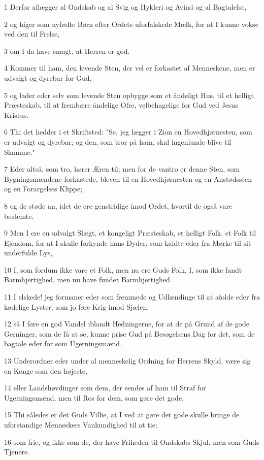 \par 1 Derfor aflægger al Ondskab og al Svig og Hykleri og Avind og al Bagtalelse,
\par 2 og higer som nyfødte Børn efter Ordets uforfalskede Mælk, for at I kunne vokse ved den til Frelse,
\par 3 om I da have smagt, at Herren er god.
\par 4 Kommer til ham, den levende Sten, der vel er forkastet af Menneskene, men er udvalgt og dyrebar for Gud,
\par 5 og lader eder selv som levende Sten opbygge som et åndeligt Hus, til et helligt Præsteskab, til at frembære åndelige Ofre, velbehagelige for Gud ved Jesus Kristus.
\par 6 Thi det hedder i et Skriftsted: "Se, jeg lægger i Zion en Hovedhjørnesten, som er udvalgt og dyrebar; og den, som tror på ham, skal ingenlunde blive til Skamme."
\par 7 Eder altså, som tro, hører Æren til; men for de vantro er denne Sten, som Bygningsmændene forkastede, bleven til en Hovedhjørnesten og en Anstødssten og en Forargelses Klippe;
\par 8 og de støde an, idet de ere genstridige imod Ordet, hvortil de også vare bestemte.
\par 9 Men I ere en udvalgt Slægt, et kongeligt Præsteskab, et helligt Folk, et Folk til Ejendom, for at I skulle forkynde hans Dyder, som kaldte eder fra Mørke til sit underfulde Lys,
\par 10 I, som fordum ikke vare et Folk, men nu ere Guds Folk, I, som ikke fandt Barmhjertighed, men nu have fundet Barmhjertighed.
\par 11 I elskede! jeg formaner eder som fremmede og Udlændinge til at afolde eder fra kødelige Lyster, som jo føre Krig imod Sjælen,
\par 12 så I føre en god Vandel iblandt Hedningerne, for at de på Grund af de gode Gerninger, som de få at se, kunne prise Gud på Besøgelsens Dag for det, som de bagtale eder for som Ugerningsmænd.
\par 13 Underordner eder under al menneskelig Ordning for Herrens Skyld, være sig en Konge som den højeste,
\par 14 eller Landshøvdinger som dem, der sendes af ham til Straf for Ugerningsmænd, men til Ros for dem, som gøre det gode.
\par 15 Thi således er det Guds Villie, at I ved at gøre det gode skulle bringe de uforstandige Menneskers Vankundighed til at tie;
\par 16 som frie, og ikke som de, der have Friheden til Ondskabs Skjul, men som Guds Tjenere.
